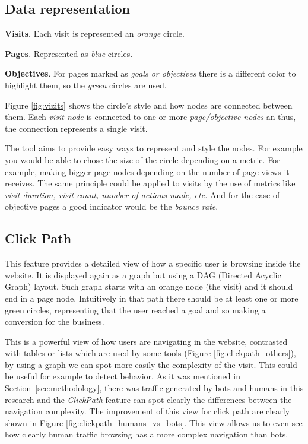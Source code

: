 \documentclass[preprint,12pt,3p]{elsarticle}
\begin{document}
\subsection{Data representation}
\label{sec:data_rep}
\textbf{Visits}. Each visit is represented an \textit{orange} circle.

\textbf{Pages}. Represented as \textit{blue} circles.

\textbf{Objectives}. For pages marked as \textit{goals or objectives} there is a different color to highlight them, so the \textit{green} circles are used.

Figure \ref{fig:vizits} shows the circle's style and how nodes are connected between them. Each \textit{visit node} is connected to one or more \textit{page/objective nodes} an thus, the connection represents a single visit.

The tool aims to provide easy ways to represent and style the nodes. For example you would be able to chose the size of the circle depending on a metric. For example, making bigger page nodes depending on the number of page views it receives.
The same principle could be applied to visits by the use of metrics like \textit{visit duration, visit count, number of actions made, etc.} And for the case of objective pages a good indicator would be the \textit{bounce rate}.


\subsection{Click Path}
\label{sec:clickpath}
This feature provides a detailed view of how a specific user is browsing inside the website. It is displayed again as a graph but using a DAG (Directed Acyclic Graph) \cite{Diestel2005} layout. Such graph starts with an orange node (the visit) and it should end in a page node.
Intuitively in that path there should be at least one or more green circles, representing that the user reached a goal and so making a conversion for the business.

This is a powerful view of how users are navigating in the website, contrasted with tables or lists which are used by some tools (Figure \ref{fig:clickpath_others}), by using a graph we can spot more easily the complexity of the visit.
This could be useful for example to detect behavior. As it was mentioned in Section~\ref{sec:methodology}, there was traffic generated by bots and humans in this research and the \textit{ClickPath} feature can spot clearly the differences between the navigation complexity. The improvement of this view for click path are clearly shown in Figure \ref{fig:clickpath_humans_vs_bots}. This view allows us to even see how clearly human traffic browsing has a more complex navigation than bots.
\end{document}
